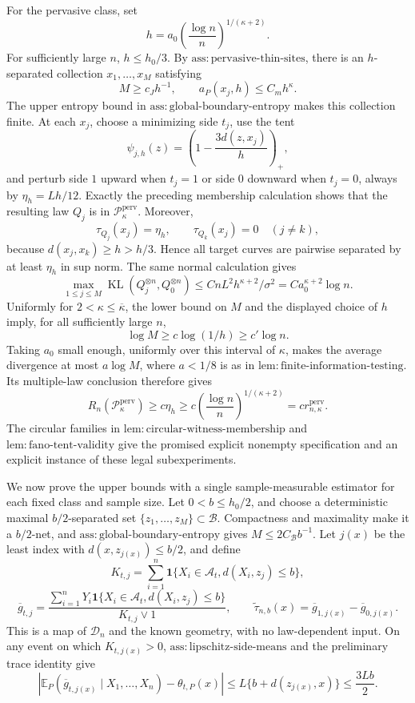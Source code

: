 For the pervasive class, set
\[
 h=a_0\left(\frac{\log n}{n}\right)^{1/(\kappa+2)}.
\]
For sufficiently large \(n\), \(h\le h_0/3\).  By \(\mathrm{ass:pervasive\text{-}thin\text{-}sites}\), there is an \(h\)-separated collection \(x_1,\ldots,x_M\) satisfying
\[
 M\ge c_Jh^{-1},\qquad
 a_P(x_j,h)\le C_mh^\kappa.
\]
The upper entropy bound in \(\mathrm{ass:global\text{-}boundary\text{-}entropy}\) makes this collection finite.  At each \(x_j\), choose a minimizing side \(t_j\), use the tent
\[
 \psi_{j,h}(z)=\left(1-\frac{3d(z,x_j)}h\right)_+,
\]
and perturb side \(1\) upward when \(t_j=1\) or side \(0\) downward when \(t_j=0\), always by \(\eta_h=Lh/12\).  Exactly the preceding membership calculation shows that the resulting law \(Q_j\) is in \(\mathcal P_\kappa^{\mathrm{perv}}\).  Moreover,
\[
 \tau_{Q_j}(x_j)=\eta_h,
 \qquad \tau_{Q_k}(x_j)=0\quad(j\ne k),
\]
because \(d(x_j,x_k)\ge h>h/3\).  Hence all target curves are pairwise separated by at least \(\eta_h\) in sup norm.  The same normal calculation gives
\[
 \max_{1\le j\le M}
 \operatorname{KL}(Q_j^{\otimes n},Q_0^{\otimes n})
 \le CnL^2h^{\kappa+2}/\sigma^2
 =Ca_0^{\kappa+2}\log n.
\]
Uniformly for \(2<\kappa\le\overline\kappa\), the lower bound on \(M\) and the displayed choice of \(h\) imply, for all sufficiently large \(n\),
\[
 \log M\ge c\log(1/h)\ge c'\log n.
\]
Taking \(a_0\) small enough, uniformly over this interval of \(\kappa\), makes the average divergence at most \(a\log M\), where \(a<1/8\) is as in \(\mathrm{lem:finite\text{-}information\text{-}testing}\).  Its multiple-law conclusion therefore gives
\[
 R_n(\mathcal P_\kappa^{\mathrm{perv}})
 \ge c\eta_h
 \ge c\left(\frac{\log n}{n}\right)^{1/(\kappa+2)}
 =c r_{n,\kappa}^{\mathrm{perv}}.
\]
The circular families in \(\mathrm{lem:circular\text{-}witness\text{-}membership}\) and \(\mathrm{lem:fano\text{-}tent\text{-}validity}\) give the promised explicit nonempty specification and an explicit instance of these legal subexperiments.

We now prove the upper bounds with a single sample-measurable estimator for each fixed class and sample size.  Let \(0<b\le h_0/2\), and choose a deterministic maximal \(b/2\)-separated set \(\{z_1,\ldots,z_M\}\subset\mathcal B\).  Compactness and maximality make it a \(b/2\)-net, and \(\mathrm{ass:global\text{-}boundary\text{-}entropy}\) gives \(M\le2C_{\mathcal B}b^{-1}\).  Let \(j(x)\) be the least index with \(d(x,z_{j(x)})\le b/2\), and define
\[
 K_{t,j}=\sum_{i=1}^n\mathbf1\{X_i\in\mathcal A_t, d(X_i,z_j)\le b\},
\]
\[
 \overline g_{t,j}=
 \frac{\sum_{i=1}^nY_i\mathbf1\{X_i\in\mathcal A_t, d(X_i,z_j)\le b\}}
 {K_{t,j}\vee1},
 \qquad
 \widetilde\tau_{n,b}(x)=\overline g_{1,j(x)}-\overline g_{0,j(x)}.
\]
This is a map of \(\mathcal D_n\) and the known geometry, with no law-dependent input.  On any event on which \(K_{t,j(x)}>0\), \(\mathrm{ass:lipschitz\text{-}side\text{-}means}\) and the preliminary trace identity give
\[
 \left|
 \mathbb E_P(\overline g_{t,j(x)}\mid X_1,\ldots,X_n)-\theta_{t,P}(x)
 \right|
 \le L\{b+d(z_{j(x)},x)\}
 \le\frac{3Lb}{2}.
\]

